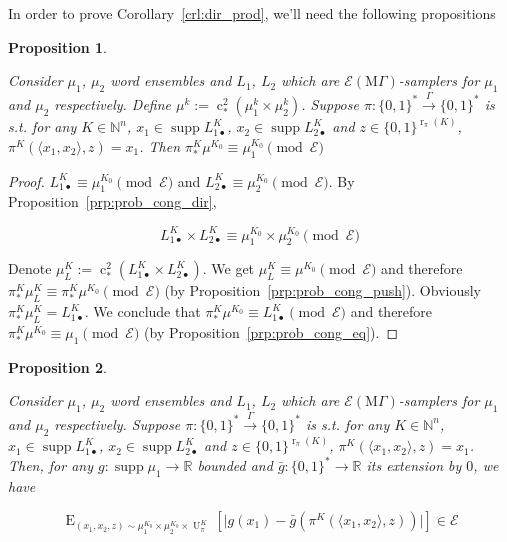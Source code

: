 \documentclass{article}
\numberwithin{equation}{section}
\theoremstyle{definition}
\theoremstyle{plain}
\newtheorem{proposition}{Proposition}[section]
\newcommand{\Bool}{\{0,1\}}
\newcommand{\Words}{{\Bool^*}}
\DeclareMathOperator{\Supp}{supp}
\DeclareMathOperator{\E}{E}
\DeclareMathOperator{\R}{r}
\DeclareMathOperator{\Un}{U}
\DeclareMathOperator{\En}{c}
\newcommand{\Nats}{\mathbb{N}}
\newcommand{\Reals}{\mathbb{R}}
\newcommand{\Abs}[1]{\lvert #1 \rvert}
\newcommand{\Chev}[1]{\langle #1 \rangle}
\newcommand{\MGrow}{\mathrm{M}\Gamma}
\newcommand{\Fall}{\mathcal{E}}
\newcommand{\EMG}{\Fall(\MGrow)}
\newcommand{\Scheme}{\xrightarrow{\Gamma}}
\begin{document}
In order to prove Corollary~\ref{crl:dir_prod}, we'll need the following propositions

\begin{samepage}
\begin{proposition}
\label{prp:thm__mult__cond1}

Consider $\mu_1$, $\mu_2$ word ensembles and $L_1$, $L_2$ which are $\EMG$-samplers for $\mu_1$ and $\mu_2$ respectively. Define ${\mu^k:=\En_*^2(\mu_1^k \times \mu_2^k)}$. Suppose $\pi: \Words \Scheme \Words$ is s.t. for any $K \in \Nats^n$, $x_1 \in \Supp L_{1\bullet}^{K}$, ${x_2 \in \Supp L_{2\bullet}^{K}}$ and $z \in \Bool^{\R_\pi(K)}$, $\pi^{K}(\Chev{x_1,x_2},z)=x_1$. Then $\pi_*^K\mu^{K_0} \equiv \mu_1^{K_0} \pmod \Fall$

\end{proposition}
\end{samepage}

\begin{proof}

$L_{1\bullet}^{K} \equiv \mu_1^{K_0} \pmod \Fall$ and $L_{2\bullet}^{K} \equiv \mu_2^{K_0} \pmod \Fall$.  By Proposition~\ref{prp:prob_cong_dir},

\[L_{1\bullet}^{K} \times L_{2\bullet}^{K} \equiv \mu_1^{K_0} \times \mu_2^{K_0} \pmod \Fall\]

Denote $\mu_L^{K}:=\En_*^2(L_{1\bullet}^{K} \times L_{2\bullet}^{K})$. We get ${\mu_L^{K} \equiv \mu^{K_0} \pmod \Fall}$ and therefore ${\pi_*^K\mu_L^{K} \equiv \pi_*^K\mu^{K_0} \pmod \Fall}$ (by Proposition~\ref{prp:prob_cong_push}). Obviously $\pi_*^K\mu_L^{K}=L_{1\bullet}^{K}$. We conclude that ${\pi_*^K\mu^{K_0} \equiv L_{1\bullet}^{K} \pmod \Fall}$ and therefore ${\pi_*^K\mu^{K_0} \equiv \mu_1 \pmod \Fall}$ (by Proposition~\ref{prp:prob_cong_eq}).
\end{proof}

\begin{samepage}
\begin{proposition}
\label{prp:thm__mult__cond2}

Consider $\mu_1$, $\mu_2$ word ensembles and $L_1$, $L_2$ which are $\EMG$-samplers for $\mu_1$ and $\mu_2$ respectively. Suppose $\pi: \Words \Scheme \Words$ is s.t. for any $K \in \Nats^n$, $x_1 \in \Supp L_{1\bullet}^{K}$, ${x_2 \in \Supp L_{2\bullet}^{K}}$ and $z \in \Bool^{\R_\pi(K)}$, $\pi^{K}(\Chev{x_1,x_2},z)=x_1$. Then, for any $g: \Supp \mu_1 \rightarrow \Reals$ bounded and ${\bar{g}: \Words \rightarrow \Reals}$ its extension by ${0}$, we have 

$$\E_{(x_1,x_2,z) \sim\mu_1^{K_0} \times \mu_2^{K_0} \times \Un_\pi^{K}}[\Abs{g(x_1)-\bar{g}(\pi^{K}(\Chev{x_1,x_2},z))}] \in \Fall$$

\end{proposition}
\end{samepage}
\end{document}
